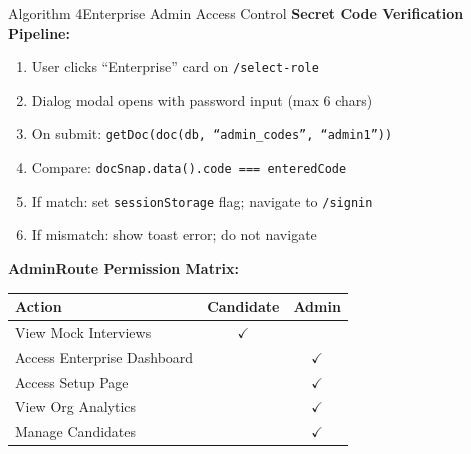 \documentclass{beamer}
\begin{document}
\begin{frame}{Algorithm 4}{Enterprise Admin Access Control}
\textbf{Secret Code Verification Pipeline:}
\begin{enumerate}
    \item User clicks ``Enterprise'' card on \texttt{/select-role}
    \item Dialog modal opens with password input (max 6 chars)
    \item On submit: \texttt{getDoc(doc(db, ``admin\_codes'', ``admin1''))}
    \item Compare: \texttt{docSnap.data().code === enteredCode}
    \item If match: set \texttt{sessionStorage} flag; navigate to \texttt{/signin}
    \item If mismatch: show toast error; do not navigate
\end{enumerate}

\vspace{3pt}
\textbf{AdminRoute Permission Matrix:}
\begin{table}
\centering
\footnotesize
\begin{tabular}{|l|c|c|}
\hline
\textbf{Action} & \textbf{Candidate} & \textbf{Admin} \\ \hline
View Mock Interviews & $\checkmark$ & \\ \hline
Access Enterprise Dashboard & & $\checkmark$ \\ \hline
Access Setup Page & & $\checkmark$ \\ \hline
View Org Analytics & & $\checkmark$ \\ \hline
Manage Candidates & & $\checkmark$ \\ \hline
\end{tabular}
\end{table}
\end{frame}
\end{document}
